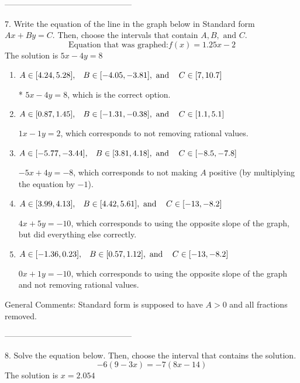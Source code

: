 \documentclass{article}[14pt]
\begin{document}
-----------------------------------------------

7. Write the equation of the line in the graph below in Standard form $Ax+By=C$. Then, choose the intervals that contain $A, B, \text{ and } C$.
$$ \text{Equation that was graphed:} f(x)= 1.25 x - 2 $$ 
The solution is $ 5 x - 4 y = 8 $ 

\begin{enumerate}[label=\Alph*.] 
\item $ A \in [4.24, 5.28], \hspace{3mm} B \in [-4.05, -3.81], \text{ and } \hspace{3mm} C \in [7, 10.7] $ 

 * $5x - 4y = 8$, which is the correct option. 
\item $ A \in [0.87, 1.45], \hspace{3mm} B \in [-1.31, -0.38], \text{ and } \hspace{3mm} C \in [1.1, 5.1] $ 

  $1x - 1y = 2$, which corresponds to not removing rational values. 
\item $ A \in [-5.77, -3.44], \hspace{3mm} B \in [3.81, 4.18], \text{ and } \hspace{3mm} C \in [-8.5, -7.8] $ 

  $-5x + 4y = -8$, which corresponds to not making $A$ positive (by multiplying the equation by $-1$). 
\item $ A \in [3.99, 4.13], \hspace{3mm} B \in [4.42, 5.61], \text{ and } \hspace{3mm} C \in [-13, -8.2] $ 

  $4x + 5y = -10$, which corresponds to using the opposite slope of the graph, but did everything else correctly. 
\item $ A \in [-1.36, 0.23], \hspace{3mm} B \in [0.57, 1.12], \text{ and } \hspace{3mm} C \in [-13, -8.2] $ 

  $0x + 1y = -10$, which corresponds to using the opposite slope of the graph and not removing rational values. 
\end{enumerate} 
 
General Comments: Standard form is supposed to have $A > 0$ and all fractions removed.

-----------------------------------------------

8. Solve the equation below. Then, choose the interval that contains the solution.
$$ -6(9-3 x) = -7(8 x-14) $$ 
The solution is $ x = 2.054 $ 
\end{document}
